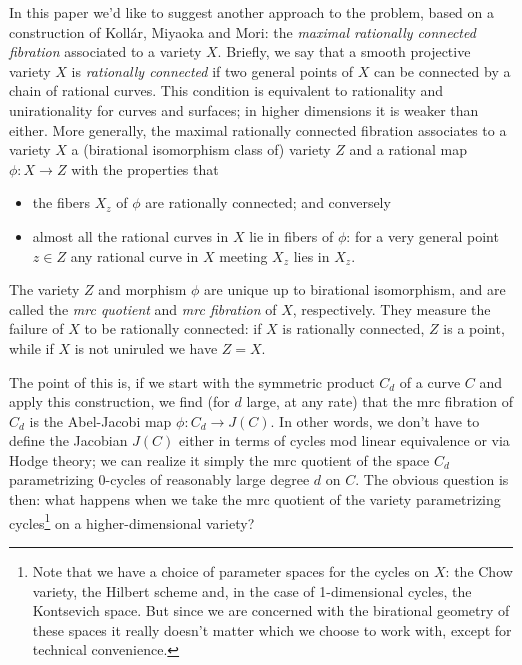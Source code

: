 \documentclass[amssymb,twoside,12 pt,amscd,reqno]{amsart}
\theoremstyle{plain}
\theoremstyle{definition}
\def\ni{\noindent}
\def\ps{\vspace{4pt}}
\begin{document}
In this paper we'd like to suggest another approach to the problem,
based on a construction of Koll\'ar, Miyaoka and Mori: the {\it
maximal rationally connected fibration} associated to a variety
$X$. Briefly, we say that a smooth projective variety $X$ is {\it
rationally connected} if two general points of $X$ can be connected by
a chain of rational curves. This condition is equivalent to
rationality and unirationality for curves and surfaces; in higher
dimensions it is weaker than either.  More generally, the maximal
rationally connected fibration associates to a variety $X$ a
(birational isomorphism class of) variety $Z$ and a rational map $\phi
: X \to Z$ with the properties that
\begin{itemize}
\item the fibers $X_z$ of $\phi$ are rationally connected; and conversely 
\item almost all the rational curves in $X$ lie in fibers of $\phi$:
for a very general point $z \in Z$ any rational curve in $X$ meeting
$X_z$ lies in $X_z$.
\end{itemize}
\ni The variety $Z$ and morphism $\phi$ are unique up to birational 
isomorphism, and are called the
\textit{mrc quotient} and \textit{mrc fibration} of $X$, respectively.
They measure the failure of $X$ to be rationally connected: if $X$ is
rationally connected, $Z$ is a point, while if $X$ is not uniruled we
have $Z=X$.

\ps

The point of this is, if we start with the symmetric product $C_d$ of
a curve $C$ and apply this construction, we find (for $d$ large, at
any rate) that the mrc fibration of $C_d$ is the Abel-Jacobi map $\phi
: C_d
\to J(C)$. In other words, we don't have to define the Jacobian 
$J(C)$ either in terms of cycles mod linear
equivalence or via Hodge theory; we can realize it simply the mrc
quotient of the space $C_d$ parametrizing $0$-cycles of reasonably
large degree $d$ on $C$. The obvious question is then: what happens
when we take the mrc quotient of the variety parametrizing
cycles\footnote{Note that we have a choice of parameter spaces for the
cycles on $X$: the Chow variety, the Hilbert scheme and, in the case
of 1-dimensional cycles, the Kontsevich space. But since we are
concerned with the birational geometry of these spaces it really
doesn't matter which we choose to work with, except for technical
convenience.} on a higher-dimensional variety?

\ps
\end{document}
